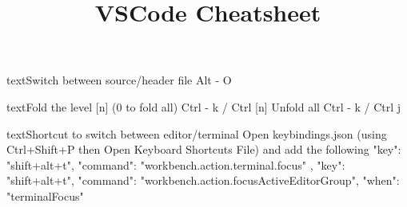 \documentclass[10pt,a4paper]{article}
\title{\color{w3schools}VSCode Cheatsheet
}
\begin{document}
\maketitle
\small
\begin{multicols}{3}

\thispagestyle{empty}
\scriptsize

% 




\begin{codebox}{text}{Switch between source/header file}
Alt - O

\end{codebox}

\begin{codebox}{text}{Fold the level [n] (0 to fold all)}
   Ctrl - k / Ctrl [n]
Unfold all
   Ctrl - k / Ctrl j

\end{codebox}

\begin{codebox}{text}{Shortcut to switch between editor/terminal}
Open keybindings.json (using Ctrl+Shift+P then
Open Keyboard Shortcuts File) and add the following
{
  "key": "shift+alt+t",
  "command": "workbench.action.terminal.focus"
},
{
  "key": "shift+alt+t",
  "command":
    "workbench.action.focusActiveEditorGroup",
  "when": "terminalFocus"
}

\end{codebox}


\AtNextBibliography{\footnotesize}
\printbibliography  
\end{multicols}
\end{document}
